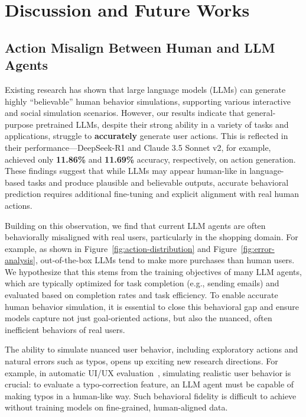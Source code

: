 \documentclass[11pt]{article}
\begin{document}
\section{Discussion and Future Works}  

\subsection{Action Misalign Between Human and LLM Agents}

Existing research has shown that large language models (LLMs) can generate highly ``believable'' human behavior simulations, supporting various interactive and social simulation scenarios.  
However, our results indicate that general-purpose pretrained LLMs, despite their strong ability in a variety of tasks and applications, struggle to \textbf{accurately} generate user actions.
This is reflected in their performance—DeepSeek-R1 and Claude 3.5 Sonnet v2, for example, achieved only \textbf{11.86\%} and \textbf{11.69\%} accuracy, respectively, on action generation. These findings suggest that while LLMs may appear human-like in language-based tasks and produce plausible and believable outputs, accurate behavioral prediction requires additional fine-tuning and explicit alignment with real human actions.  

Building on this observation, we find that current LLM agents are often behaviorally misaligned with real users, particularly in the shopping domain. For example, as shown in Figure~\ref{fig:action-distribution} and Figure~\ref{fig:error-analysis}, out-of-the-box LLMs tend to make more purchases than human users.
We hypothesize that this stems from the training objectives of many LLM agents, which are typically optimized for task completion (e.g., sending emails) and evaluated based on completion rates and task efficiency.
To enable accurate human behavior simulation, it is essential to close this behavioral gap and ensure models capture not just goal-oriented actions, but also the nuanced, often inefficient behaviors of real users.

The ability to simulate nuanced user behavior, including exploratory actions and natural errors such as typos, opens up exciting new research directions. For example, in automatic UI/UX evaluation~\cite{luUXAgentSystemSimulating2025}, simulating realistic user behavior is crucial: to evaluate a typo-correction feature, an LLM agent must be capable of making typos in a human-like way.
Such behavioral fidelity is difficult to achieve without training models on fine-grained, human-aligned data.
\end{document}
